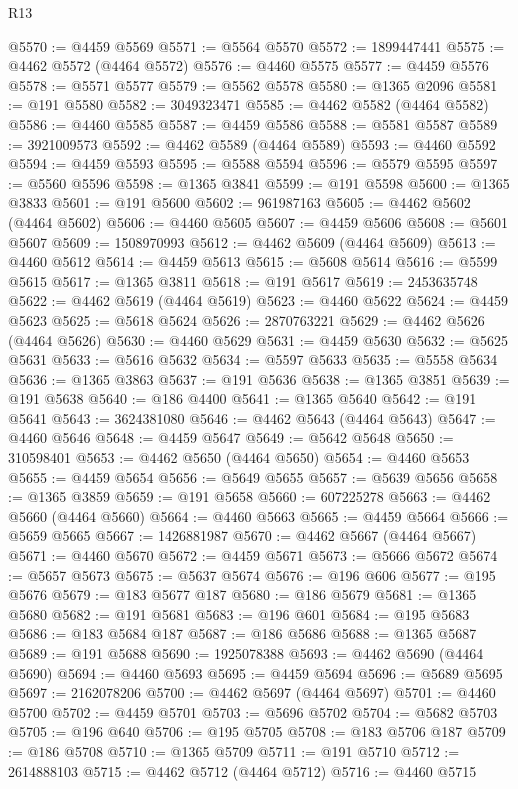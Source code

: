 \begin{lexlean}{R13}
\begin{coremodule}
@5570 := @4459 @5569
@5571 := @5564 @5570
@5572 := 1899447441
@5575 := @4462 @5572 (@4464 @5572)
@5576 := @4460 @5575
@5577 := @4459 @5576
@5578 := @5571 @5577
@5579 := @5562 @5578
@5580 := @1365 @2096
@5581 := @191 @5580
@5582 := 3049323471
@5585 := @4462 @5582 (@4464 @5582)
@5586 := @4460 @5585
@5587 := @4459 @5586
@5588 := @5581 @5587
@5589 := 3921009573
@5592 := @4462 @5589 (@4464 @5589)
@5593 := @4460 @5592
@5594 := @4459 @5593
@5595 := @5588 @5594
@5596 := @5579 @5595
@5597 := @5560 @5596
@5598 := @1365 @3841
@5599 := @191 @5598
@5600 := @1365 @3833
@5601 := @191 @5600
@5602 := 961987163
@5605 := @4462 @5602 (@4464 @5602)
@5606 := @4460 @5605
@5607 := @4459 @5606
@5608 := @5601 @5607
@5609 := 1508970993
@5612 := @4462 @5609 (@4464 @5609)
@5613 := @4460 @5612
@5614 := @4459 @5613
@5615 := @5608 @5614
@5616 := @5599 @5615
@5617 := @1365 @3811
@5618 := @191 @5617
@5619 := 2453635748
@5622 := @4462 @5619 (@4464 @5619)
@5623 := @4460 @5622
@5624 := @4459 @5623
@5625 := @5618 @5624
@5626 := 2870763221
@5629 := @4462 @5626 (@4464 @5626)
@5630 := @4460 @5629
@5631 := @4459 @5630
@5632 := @5625 @5631
@5633 := @5616 @5632
@5634 := @5597 @5633
@5635 := @5558 @5634
@5636 := @1365 @3863
@5637 := @191 @5636
@5638 := @1365 @3851
@5639 := @191 @5638
@5640 := @186 @4400
@5641 := @1365 @5640
@5642 := @191 @5641
@5643 := 3624381080
@5646 := @4462 @5643 (@4464 @5643)
@5647 := @4460 @5646
@5648 := @4459 @5647
@5649 := @5642 @5648
@5650 := 310598401
@5653 := @4462 @5650 (@4464 @5650)
@5654 := @4460 @5653
@5655 := @4459 @5654
@5656 := @5649 @5655
@5657 := @5639 @5656
@5658 := @1365 @3859
@5659 := @191 @5658
@5660 := 607225278
@5663 := @4462 @5660 (@4464 @5660)
@5664 := @4460 @5663
@5665 := @4459 @5664
@5666 := @5659 @5665
@5667 := 1426881987
@5670 := @4462 @5667 (@4464 @5667)
@5671 := @4460 @5670
@5672 := @4459 @5671
@5673 := @5666 @5672
@5674 := @5657 @5673
@5675 := @5637 @5674
@5676 := @196 @606
@5677 := @195 @5676
@5679 := @183 @5677 @187
@5680 := @186 @5679
@5681 := @1365 @5680
@5682 := @191 @5681
@5683 := @196 @601
@5684 := @195 @5683
@5686 := @183 @5684 @187
@5687 := @186 @5686
@5688 := @1365 @5687
@5689 := @191 @5688
@5690 := 1925078388
@5693 := @4462 @5690 (@4464 @5690)
@5694 := @4460 @5693
@5695 := @4459 @5694
@5696 := @5689 @5695
@5697 := 2162078206
@5700 := @4462 @5697 (@4464 @5697)
@5701 := @4460 @5700
@5702 := @4459 @5701
@5703 := @5696 @5702
@5704 := @5682 @5703
@5705 := @196 @640
@5706 := @195 @5705
@5708 := @183 @5706 @187
@5709 := @186 @5708
@5710 := @1365 @5709
@5711 := @191 @5710
@5712 := 2614888103
@5715 := @4462 @5712 (@4464 @5712)
@5716 := @4460 @5715

\end{coremodule}
\end{lexlean}
